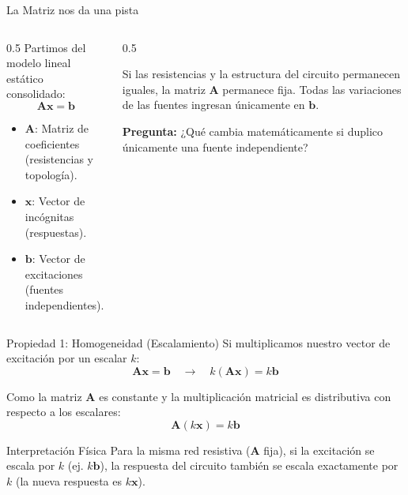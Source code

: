 \documentclass[aspectratio=169, table, xcdraw]{beamer}
\begin{document}
\begin{frame}{La Matriz nos da una pista}
    \begin{columns}
        \begin{column}{0.5\textwidth}
            Partimos del modelo lineal estático consolidado:
            \begin{equation*}
                \bm{A} \bm{x} = \bm{b}
            \end{equation*}
            
            \begin{itemize}
                \item $\bm{A}$: Matriz de coeficientes (resistencias y topología).
                \item $\bm{x}$: Vector de incógnitas (respuestas).
                \item $\bm{b}$: Vector de excitaciones (fuentes independientes).
            \end{itemize}
        \end{column}
        \begin{column}{0.5\textwidth}
            \begin{tcolorbox}[colback=ucbblue!5, colframe=ucbblue, title=Condición de Red Fija]
                Si las resistencias y la estructura del circuito permanecen iguales, la matriz $\bm{A}$ permanece fija. Todas las variaciones de las fuentes ingresan únicamente en $\bm{b}$.
            \end{tcolorbox}
            \textbf{Pregunta:} ¿Qué cambia matemáticamente si duplico únicamente una fuente independiente?
        \end{column}
    \end{columns}
\end{frame}

\begin{frame}{Propiedad 1: Homogeneidad (Escalamiento)}
    Si multiplicamos nuestro vector de excitación por un escalar $k$:
    \begin{equation*}
        \bm{A} \bm{x} = \bm{b} \quad \longrightarrow \quad k(\bm{A} \bm{x}) = k\bm{b}
    \end{equation*}
    
    Como la matriz $\bm{A}$ es constante y la multiplicación matricial es distributiva con respecto a los escalares:
    \begin{equation*}
        \bm{A} (k\bm{x}) = k\bm{b}
    \end{equation*}
    
    \begin{alertblock}{Interpretación Física}
        Para la misma red resistiva ($\bm{A}$ fija), si la excitación se escala por $k$ (ej. $k\bm{b}$), la respuesta del circuito también se escala exactamente por $k$ (la nueva respuesta es $k\bm{x}$).
    \end{alertblock}
\end{frame}
\end{document}
